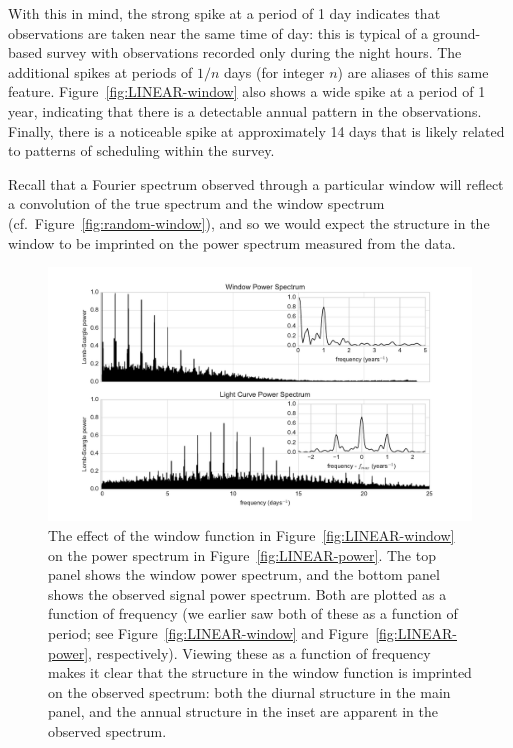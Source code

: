 \documentclass[preprint]{aastex}
\newcommand{\fig}[1]{Figure~\ref{fig:#1}}
\newcommand{\figlabel}[1]{\label{fig:#1}}
\begin{document}
With this in mind, the strong spike at a period of 1 day indicates
that observations are
taken near the same time of day: this is typical of a ground-based survey
with observations recorded only during the night hours.
The additional spikes at periods of $1/n$ days (for integer $n$) are aliases
of this same feature.
\fig{LINEAR-window} also shows a wide spike at a period of 1 year, indicating
that there is a detectable annual pattern in the observations.
Finally, there is a noticeable spike at approximately 14 days that is likely
related to patterns of scheduling within the survey.

Recall that a Fourier spectrum observed through a particular window will reflect
a convolution of the true spectrum and the window spectrum
(cf.\ \fig{random-window}), and so we would expect the structure in the window
to be imprinted on the power spectrum measured from the data.

\begin{figure}[ht]
  \centering
  \includegraphics[width=\textwidth]{fig15_LINEAR_window_effect}
  \caption{The effect of the window function in \fig{LINEAR-window} on the
    power spectrum in \fig{LINEAR-power}.
    The top panel shows the window power spectrum, and the bottom panel shows
    the observed signal power spectrum.
    Both are plotted as a function of frequency (we earlier saw both of these
    as a function of period; see \fig{LINEAR-window} and \fig{LINEAR-power},
    respectively).
    Viewing these as a function of frequency makes it clear that the structure
    in the window function is imprinted on the observed spectrum: both the
    diurnal structure in the main panel, and the annual structure in the inset
    are apparent in the observed spectrum.
    \figlabel{LINEAR-window-effect}}
\end{figure}
\end{document}
